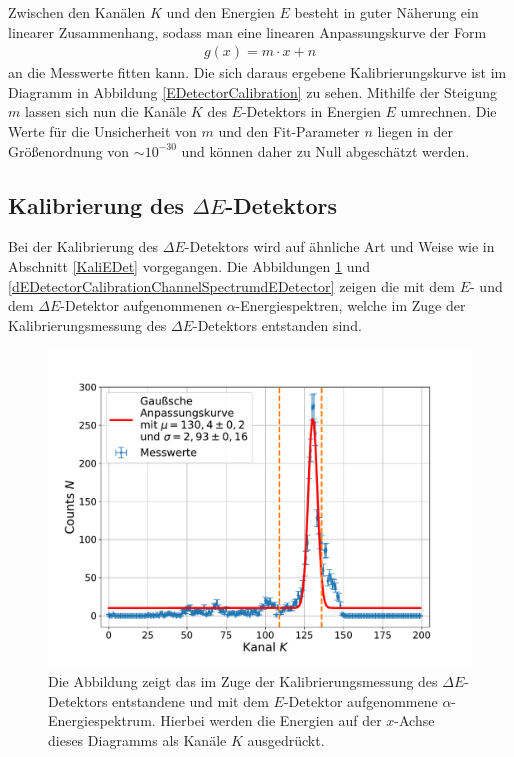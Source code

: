 \noindent Zwischen den Kanälen $K$ und den Energien $E$ besteht in guter Näherung ein linearer Zusammenhang, sodass man eine linearen Anpassungskurve der Form
\begin{align} \label{line}
g(x)=m\cdot x + n
\end{align}
\noindent an die Messwerte fitten kann.
Die sich daraus ergebene Kalibrierungskurve ist im Diagramm in Abbildung \ref{EDetectorCalibration} zu sehen.
Mithilfe der Steigung $m$ lassen sich nun die Kanäle $K$ des $E$-Detektors in Energien $E$ umrechnen.
Die Werte für die Unsicherheit von $m$ und den Fit-Parameter $n$ liegen in der Größenordnung von $\sim10^{-30}$ und können daher zu Null abgeschätzt werden.

\subsection{Kalibrierung des $\Delta E$-Detektors} \label{KalidEDet}

Bei der Kalibrierung des $\Delta E$-Detektors wird auf ähnliche Art und Weise wie in Abschnitt \ref{KaliEDet} vorgegangen.
Die Abbildungen \ref{dEDetectorCalibrationChannelSpectrumEDetector} und \ref{dEDetectorCalibrationChannelSpectrumdEDetector} zeigen die mit dem $E$- und dem $\Delta E$-Detektor aufgenommenen $\alpha$-Energiespektren, welche im Zuge der Kalibrierungsmessung des $\Delta E$-Detektors entstanden sind.
\begin{figure}[H]
	\centering
	\includegraphics[width=1.0\textwidth]{src/dEDetectorCalibrationChannelSpectrumEDetector}
	\caption{Die Abbildung zeigt das im Zuge der Kalibrierungsmessung des $\Delta E$-Detektors entstandene und mit dem $E$-Detektor aufgenommene $\alpha$-Energiespektrum. Hierbei werden die Energien auf der $x$-Achse dieses Diagramms als Kanäle $K$ ausgedrückt.}
	\label{dEDetectorCalibrationChannelSpectrumEDetector}
\end{figure}

